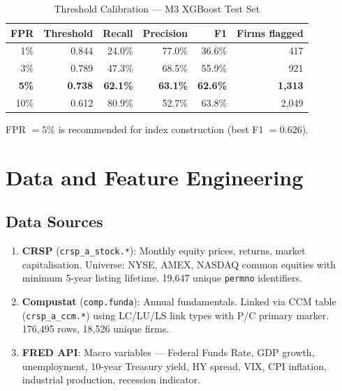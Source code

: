 \documentclass{report}\usepackage[]{graphicx}\usepackage[table]{xcolor}
\begin{document}
\begin{table}[H]
\centering
\caption{Threshold Calibration — M3 XGBoost Test Set}
\begin{tabular}{rrrrrr}
\toprule
\textbf{FPR} & \textbf{Threshold} & \textbf{Recall} & \textbf{Precision} & \textbf{F1} & \textbf{Firms flagged} \\
\midrule
1\% & 0.844 & 24.0\% & 77.0\% & 36.6\% & 417 \\
3\% & 0.789 & 47.3\% & 68.5\% & 55.9\% & 921 \\
\textbf{5\%} & \textbf{0.738} & \textbf{62.1\%} & \textbf{63.1\%} & \textbf{62.6\%} & \textbf{1,313} \\
10\% & 0.612 & 80.9\% & 52.7\% & 63.8\% & 2,049 \\
\bottomrule
\end{tabular}
\end{table}

\noindent FPR $= 5\%$ is recommended for index construction (best F1 $= 0.626$).

\chapter{Data and Feature Engineering}
\label{ch:data}

\section{Data Sources}

\begin{enumerate}
    \item \textbf{CRSP} (\texttt{crsp\_a\_stock.*}): Monthly equity prices, returns, 
    market capitalisation. Universe: NYSE, AMEX, NASDAQ common equities with 
    minimum 5-year listing lifetime. 19,647 unique \texttt{permno} identifiers.
    
    \item \textbf{Compustat} (\texttt{comp.funda}): Annual fundamentals. 
    Linked via CCM table (\texttt{crsp\_a\_ccm.*}) using LC/LU/LS link types 
    with P/C primary marker. 176,495 rows, 18,526 unique firms.
    
    \item \textbf{FRED API}: Macro variables — Federal Funds Rate, GDP growth, 
    unemployment, 10-year Treasury yield, HY spread, VIX, CPI inflation, 
    industrial production, recession indicator.
\end{enumerate}
\end{document}
